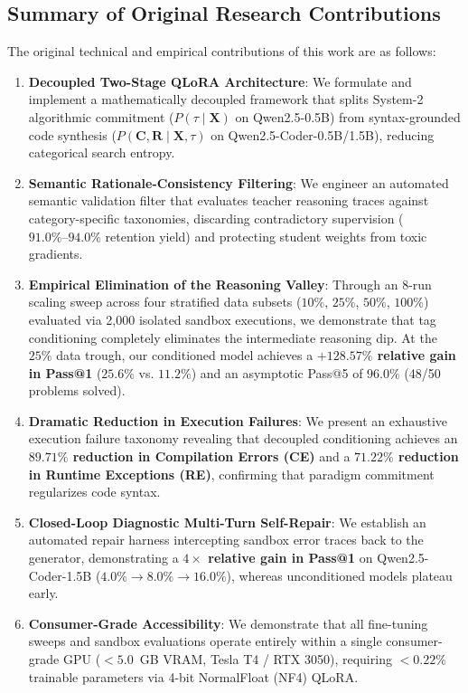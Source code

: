 \documentclass{ieeeaccess}
\begin{document}
\subsection{Summary of Original Research Contributions}
The original technical and empirical contributions of this work are as follows:
\begin{enumerate}
    \item \textbf{Decoupled Two-Stage QLoRA Architecture}: We formulate and implement a mathematically decoupled framework that splits System-2 algorithmic commitment ($P(\tau \mid \mathbf{X})$ on Qwen2.5-0.5B) from syntax-grounded code synthesis ($P(\mathbf{C}, \mathbf{R} \mid \mathbf{X}, \tau)$ on Qwen2.5-Coder-0.5B/1.5B), reducing categorical search entropy.
    \item \textbf{Semantic Rationale-Consistency Filtering}: We engineer an automated semantic validation filter that evaluates teacher reasoning traces against category-specific taxonomies, discarding contradictory supervision ($91.0\%\text{--}94.0\%$ retention yield) and protecting student weights from toxic gradients.
    \item \textbf{Empirical Elimination of the Reasoning Valley}: Through an 8-run scaling sweep across four stratified data subsets ($10\%$, $25\%$, $50\%$, $100\%$) evaluated via 2,000 isolated sandbox executions, we demonstrate that tag conditioning completely eliminates the intermediate reasoning dip. At the $25\%$ data trough, our conditioned model achieves a \textbf{$+128.57\%$ relative gain in Pass@1} ($25.6\%$ vs. $11.2\%$) and an asymptotic Pass@5 of \textbf{$96.0\%$} (48/50 problems solved).
    \item \textbf{Dramatic Reduction in Execution Failures}: We present an exhaustive execution failure taxonomy revealing that decoupled conditioning achieves an \textbf{$89.71\%$ reduction in Compilation Errors (CE)} and a \textbf{$71.22\%$ reduction in Runtime Exceptions (RE)}, confirming that paradigm commitment regularizes code syntax.
    \item \textbf{Closed-Loop Diagnostic Multi-Turn Self-Repair}: We establish an automated repair harness intercepting sandbox error traces back to the generator, demonstrating a \textbf{$4\times$ relative gain in Pass@1} on Qwen2.5-Coder-1.5B ($4.0\% \to 8.0\% \to 16.0\%$), whereas unconditioned models plateau early.
    \item \textbf{Consumer-Grade Accessibility}: We demonstrate that all fine-tuning sweeps and sandbox evaluations operate entirely within a single consumer-grade GPU ($<5.0$~GB VRAM, Tesla T4 / RTX 3050), requiring $<0.22\%$ trainable parameters via 4-bit NormalFloat (NF4) QLoRA.
\end{enumerate}
\end{document}

